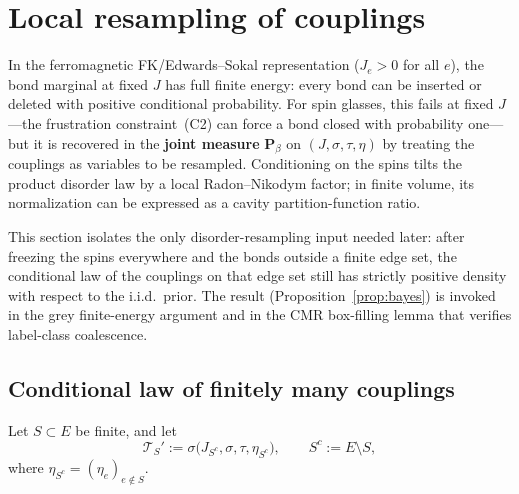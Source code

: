 \documentclass[11pt]{article}
\numberwithin{theorem}{section}
\theoremstyle{remark}
\begin{document}
\begin{figure}[H]
{
}
\end{figure}


\section{Local resampling of couplings}\label{sec:bayesian}

In the ferromagnetic FK/Edwards--Sokal representation ($J_e > 0$ for all $e$), the bond marginal at fixed $J$ has full finite energy: every bond can be inserted or deleted with positive conditional probability.
For spin glasses, this fails at fixed $J$---the frustration constraint~(C2) can force a bond closed with probability one---but it is recovered in the \textbf{joint measure} $\mathbf{P}_\beta$ on $(J, \sigma, \tau, \eta)$ by treating the couplings as variables to be resampled.
Conditioning on the spins tilts the product disorder law by a local Radon--Nikodym factor; in finite volume, its normalization can be expressed as a cavity partition-function ratio.

This section isolates the only disorder-resampling input needed later: after freezing the spins everywhere and the bonds outside a finite edge set, the conditional law of the couplings on that edge set still has strictly positive density with respect to the i.i.d.\ prior.
The result (Proposition~\ref{prop:bayes}) is invoked in the grey finite-energy argument and in the CMR box-filling lemma that verifies label-class coalescence.

\subsection{Conditional law of finitely many couplings}\label{sec:fv-conditional}

Let $S \subset E$ be finite, and let
\[
  \mathcal{T}_S' := \sigma\bigl(J_{S^c}, \sigma, \tau, \eta_{S^c}\bigr),
  \qquad S^c := E \setminus S,
\]
where $\eta_{S^c} = (\eta_e)_{e \notin S}$.
\end{document}
